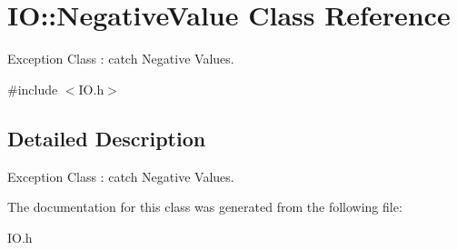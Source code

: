 \hypertarget{classIO_1_1NegativeValue}{}\section{IO\+:\+:Negative\+Value Class Reference}
\label{classIO_1_1NegativeValue}


Exception Class \+: catch Negative Values.  




{\ttfamily \#include $<$I\+O.\+h$>$}



\subsection{Detailed Description}
Exception Class \+: catch Negative Values. 

The documentation for this class was generated from the following file\+:\begin{DoxyCompactItemize}
\item 
I\+O.\+h\end{DoxyCompactItemize}
